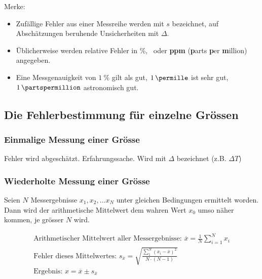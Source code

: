 Merke:

\begin{itemize}
    \item
        Zuf\"allige Fehler aus einer Messreihe  werden mit $s$ bezeichnet, auf
        Absch\"atzungen beruhende Unsicherheiten mit $\Delta$.
    \item
        \"Ublicherweise  werden  relative  Fehler  in  \%,  \perthousand~oder
        \textbf{ppm} (\textbf{p}arts \textbf{p}er \textbf{m}illion) angegeben.
    \item
        Eine   Messgenauigkeit   von    $\SI{1}{\percent}$   gilt   als   gut,
        $\SI{1}{\permille}$    ist   sehr    gut,   $\SI{1}{\partspermillion}$
        astronomisch gut.
\end{itemize}


\subsection{Die Fehlerbestimmung f\"ur einzelne Gr\"ossen}

\subsubsection{Einmalige Messung einer Gr\"osse}

Fehler  wird  abgesch\"atzt. Erfahrungssache. Wird   mit  $\Delta$  bezeichnet
(z.B. $\Delta T$)

\subsubsection{Wiederholte Messung einer Gr\"osse}

Seien  $N$  Messergebnisse $x_1,  x_2,  ...  x_N$ unter  gleichen  Bedingungen
ermittelt worden. Dann wird der arithmetische Mittelwert dem wahren Wert $x_0$
umso n\"aher kommen, je gr\"osser $N$ wird.

\begin{gather}
    \text{Arithmetischer Mittelwert aller Messergebnisse: } \overline{x} = \frac{1}{N} \sum_{i=1}^{N}{x_i} \\
    \text{Fehler dieses Mittelwertes: } s_{\overline{x}} = \sqrt{ \frac{\sum_{1}^{N}{(x_i-\overline{x})^2}}{N \cdot (N-1)}} \\
    \text{Ergebnis: } x = \overline{x} \pm s_{\overline{x}}
\end{gather}

